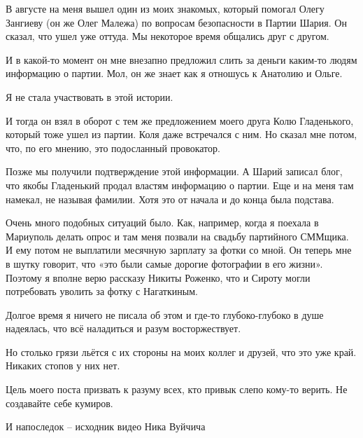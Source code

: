 В августе на меня вышел один из моих знакомых, который помогал Олегу Зангиеву
(он же Олег Малежа) по вопросам безопасности в Партии Шария. Он сказал, что
ушел уже оттуда. Мы некоторое время общались друг с другом. 

И в какой-то момент он мне внезапно предложил слить за деньги каким-то людям
информацию о партии. Мол, он же знает как я отношусь к Анатолию и Ольге. 

Я не стала участвовать в этой истории. 

И тогда он взял в оборот с тем же предложением моего друга Колю Гладенького,
который тоже ушел из партии. Коля даже встречался с ним. Но сказал мне потом,
что, по его мнению, это подосланный провокатор. 

Позже мы получили подтверждение этой информации. А Шарий записал блог, что
якобы Гладенький продал властям информацию о партии. Еще и на меня там намекал,
не называя фамилии. Хотя это от начала и до конца была подстава. 

Очень много подобных ситуаций было. Как, например, когда я поехала в Мариуполь
делать опрос и там меня позвали на свадьбу партийного СММщика. И ему потом не
выплатили месячную зарплату за фотки со мной. Он теперь мне в шутку говорит,
что «это были самые дорогие фотографии в его жизни». Поэтому я вполне верю
рассказу Никиты Роженко, что и Сироту могли потребовать уволить за фотку с
Нагаткиным. 

Долгое время я ничего не писала об этом и где-то глубоко-глубоко в душе
надеялась, что всё наладиться и разум восторжествует. 

Но столько грязи льётся с их стороны на моих коллег и друзей, что это уже край.
Никаких стопов у них нет. 

Цель моего поста призвать к разуму всех, кто привык слепо кому-то верить. Не
создавайте себе кумиров. 

И напоследок – исходник видео Ника Вуйчича

